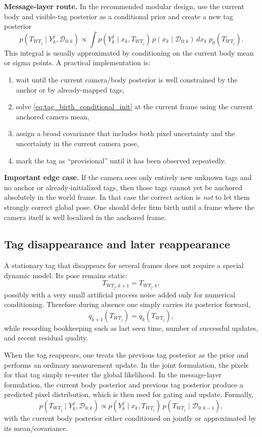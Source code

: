 \documentclass[11pt]{report}
\begin{document}
\textbf{Message-layer route.} In the recommended modular design, use the current body and visible-tag posterior as a conditional prior and create a new tag posterior
\begin{equation}
p(T_{WT_j}\mid Y_k^j,\mathcal D_{0:k})
\propto
\int p(Y_k^j\mid x_k,T_{WT_j})\,p(x_k\mid\mathcal D_{0:k})\,dx_k\;p_0(T_{WT_j}).
\label{eq:new_tag_birth_integral}
\end{equation}
This integral is usually approximated by conditioning on the current body mean or sigma points. A practical implementation is:
\begin{enumerate}
    \item wait until the current camera/body posterior is well constrained by the anchor or by already-mapped tags,
    \item solve \eqref{eq:tag_birth_conditional_init} at the current frame using the current anchored camera mean,
    \item assign a broad covariance that includes both pixel uncertainty and the uncertainty in the current camera pose,
    \item mark the tag as ``provisional'' until it has been observed repeatedly.
\end{enumerate}
\textbf{Important edge case.} If the camera sees only entirely new unknown tags and no anchor or already-initialized tags, then those tags cannot yet be anchored absolutely in the world frame. In that case the correct action is \emph{not} to let them strongly correct global pose. One should defer firm birth until a frame where the camera itself is well localized in the anchored frame.

\subsection{Tag disappearance and later reappearance}
A stationary tag that disappears for several frames does not require a special dynamic model. Its pose remains static:
\[
T_{WT_j,k+1}=T_{WT_j,k},
\]
possibly with a very small artificial process noise added only for numerical conditioning. Therefore during absence one simply carries its posterior forward,
\[
q_{k+1}(T_{WT_j}) = q_k(T_{WT_j}),
\]
while recording bookkeeping such as last seen time, number of successful updates, and recent residual quality.

When the tag reappears, one treats the previous tag posterior as the prior and performs an ordinary measurement update. In the joint formulation, the pixels for that tag simply re-enter the global likelihood. In the message-layer formulation, the current body posterior and previous tag posterior produce a predicted pixel distribution, which is then used for gating and update. Formally,
\begin{equation}
p(T_{WT_j}\mid Y_k^j,\mathcal D_{0:k})
\propto
p(Y_k^j\mid x_k,T_{WT_j})\,p(T_{WT_j}\mid\mathcal D_{0:k-1}),
\label{eq:reappearing_tag_update}
\end{equation}
with the current body posterior either conditioned on jointly or approximated by its mean/covariance.
\end{document}
